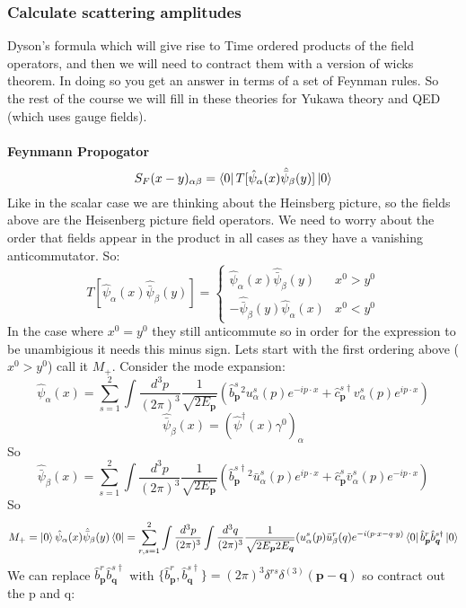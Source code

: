\documentclass[12pt, a4paper, twoside, titlepage]{article}
\begin{document}
\begin{pmartix}
\subsubsection{Calculate scattering amplitudes}
Dyson's formula which will give rise to Time ordered products of the field operators, and then we will need to contract them with a version of wicks theorem. In doing so you get an answer in terms of a set of Feynman rules. So the rest of the course we will fill in these theories for Yukawa theory and QED (which uses gauge fields).\\\\
\textbf{Feynmann Propogator}\\
$$
S_F(x-y)_{\alpha \beta} = \bra{0} T[\hat \psi_{\alpha}(x) \hat {\bar{\psi}}_{\beta}(y)] \ket{0}
$$
Like in the scalar case we are thinking about the Heinsberg picture, so the fields above are the Heisenberg picture field operators. We need to worry about the order that fields appear in the product in all cases as they have a vanishing anticommutator. So:
$$
                                                T[\hat \psi_{\alpha}(x) \hat {\bar{\psi}}_{\beta}(y)]  = \begin{cases} \hat \psi_{\alpha}(x) \hat {\bar{\psi}}_{\beta}(y) & x^0 > y^0\\
                                                -\hat {\bar{\psi}}_{\beta}(y) \hat \psi_{\alpha}(x)  & x^0 < y^0 \end{cases}
$$
In the case where $x^0 = y^0$ they still anticommute so in order for the expression to be unambigious it needs this minus sign.  Lets start with the first ordering above ($x^0 > y^0$) call it $M_+$. Consider the mode expansion:
$$
\hat \psi_{\alpha}(x) = \sum_{s=1}^2 \int \frac{d^3 p}{(2 \pi)^3} \frac{1}{\sqrt{2 E_{\bm p}}} ( \hat b^s_{\bm p}^2 u^s_{\alpha}(p) e^{-i p\cdot x} + \hat c^{s \dagger}_{\bm p} v^s_{\alpha} (p) e^{i p \cdot x})
$$
$$
\hat {\bar{\psi}}_{\beta}(x) = (\hat \psi^{\dagger} (x) \gamma^0)_{\alpha}
$$
So
$$
\hat {\bar{\psi}}_{\beta}(x) = \sum_{s=1}^2 \int \frac{d^3 p}{(2 \pi)^3} \frac{1}{\sqrt{2 E_{\bm p}}} ( \hat b^{s \dagger}_{\bm p}^2 \bar{u}^s_{\alpha}(p) e^{i p\cdot x} + \hat c^{s}_{\bm p} \bar{v}^s_{\alpha} (p) e^{-i p \cdot x})
$$
So
$$
M_+ = \ket{0} \hat \psi_{\alpha}(x) \hat {\bar{\psi}}_{\beta}(y) \bra{0} = \sum_{r,s=1}^2 \int \frac{d^3p}{(2\pi)^3} \int \frac{d^3 q}{(2 \pi)^3} \frac{1}{\sqrt{2 E_{\bm p} 2 E_{\bm q}}} (u^s_{\alpha} (p) \bar{u}^r_{\beta} (q) e^{-i(p\cdot x - q \cdot y)} \bra{0} \hat b^r_{\bm p} \hat b^{s \dagger}_{\bm q} \ket{0}
$$
We can replace $ \hat b^r_{\bm p} \hat b^{s \dagger}_{\bm q}$ with $\{ \hat b^r_{\bm p} ,\hat b^{s \dagger}_{\bm q} \} = (2\pi)^3 \delta^{rs} \delta^{(3)}(\bm p - \bm q)$ so contract out the p and q:

\end{pmartix}
\end{document}
